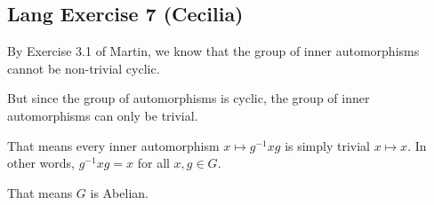 \subsection*{Lang Exercise 7 (Cecilia)}
By Exercise 3.1 of Martin, we know that the group of inner automorphisms cannot be non-trivial cyclic.

But since the group of automorphisms is cyclic, the group of inner automorphisms can only be trivial.

That means every inner automorphism $ x \mapsto g^{-1}xg $ is simply trivial $ x \mapsto x $. In other words, $ g^{-1}xg = x $ for all $ x, g \in G $.

That means $ G $ is Abelian.